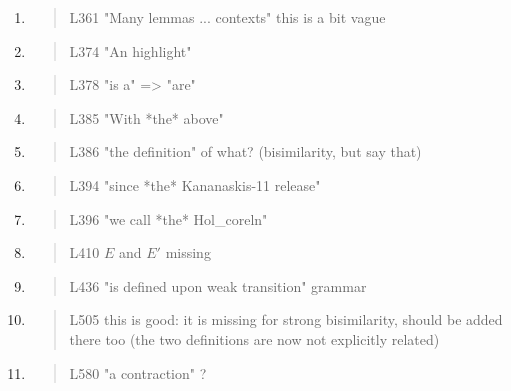 \begin{enumerate}
\item \begin{quote}
    L361 "Many lemmas ... contexts" this is a bit vague
  \end{quote}

\item \begin{quote}
    L374 "An highlight"
  \end{quote}

\item \begin{quote}
    L378 "is a" => "are"
  \end{quote}

\item \begin{quote}
    L385 "With *the* above"
  \end{quote}

\item \begin{quote}
    L386 "the definition" of what? (bisimilarity, but say that)
  \end{quote}

\item \begin{quote}
    L394 "since *the* Kananaskis-11 release"
  \end{quote}

\item \begin{quote}
    L396 "we call *the* Hol_coreln"
  \end{quote}

\item \begin{quote}
    L410 $E$ and $E'$ missing
  \end{quote}

\item \begin{quote}
    L436 "is defined upon weak transition" grammar
  \end{quote}

\item \begin{quote}
    L505 this is good: it is missing for strong bisimilarity, should
    be added there too (the two definitions are now not explicitly
    related)
  \end{quote}

\item \begin{quote}
    L580 "a contraction" ?
  \end{quote}


\end{enumerate}
